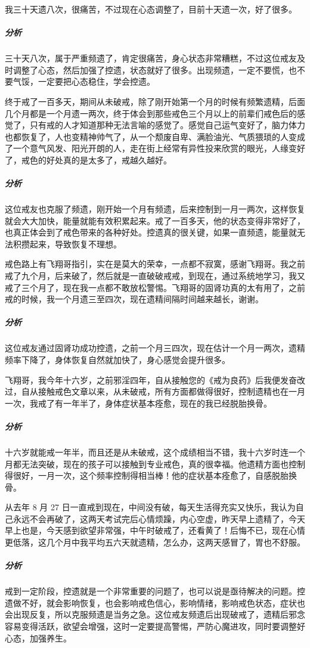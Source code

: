 \begin{case}
    我三十天遗八次，很痛苦，不过现在心态调整了，目前十天遗一次，好了很多。
    \subparagraph{分析} 三十天八次，属于严重频遗了，肯定很痛苦，身心状态非常糟糕，不过这位戒友及时调整了心态，然后加强了控遗，状态就好了很多。出现频遗，一定不要慌，也不要气馁，一定要把心态稳住，学会控遗。
\end{case}

\begin{case}
    终于戒了一百多天，期间从未破戒，除了刚开始第一个月的时候有频繁遗精，后面几个月都是一个月遗一两次，终于体会到那些戒色三个月以上的前辈们戒色后的感觉了，只有戒的人才知道那种无法言喻的感觉了。感觉自己运气变好了，脑力体力也都恢复了，人也变精神帅气了，从一个颓废自卑、满脸油光、气质猥琐的人变成了一个意气风发、阳光开朗的人，走在街上经常有异性投来欣赏的眼光，人缘变好了，戒色的好处真的是太多了，戒越久越好。
    \subparagraph{分析} 这位戒友也克服了频遗，刚开始一个月有频遗，后来控制到一月一两次，这样恢复就会大大加快，能量就能有效积累起来。戒了一百多天，他的状态变得非常好了，也真正体会到了戒色带来的各种好处。控遗真的很关键，如果一直频遗，能量就无法积攒起来，导致恢复不理想。
\end{case}

\begin{case}
    戒色路上有飞翔哥指引，实在是莫大的荣幸，一点都不寂寞，感谢飞翔哥。我之前戒了九个月，后来破了，然后就是一直破破戒戒，到现在，通过系统地学习，我又戒了三个月了，现在我一点都不敢放松警惕。飞翔哥的固肾功真的太有用了，之前戒的时候，我一个月遗三至四次，现在遗精间隔时间越来越长，谢谢。
    \subparagraph{分析} 这位戒友通过固肾功成功控遗，之前一个月三四次，现在估计一个月一两次，遗精频率下降了，身体恢复自然就加快了，身心感觉会提升很多。
\end{case}

\begin{case}
    飞翔哥，我今年十六岁，之前邪淫四年，自从接触您的《戒为良药》后我便发奋改过，自从接触戒色文章以来，从未破戒，所有方面都做得很好，控制遗精也在一月一次，我戒了有一年半了，身体症状基本痊愈，现在的我已经脱胎换骨。
    \subparagraph{分析} 十六岁就能戒一年半，而且还是从未破戒，这个成绩相当不错，我十六岁时连一个月都无法突破，现在的孩子可以接触到专业戒色，真的很幸福。他遗精方面也控制得很好，一月一次，这个频率控制得相当棒！他的症状基本痊愈了，自感脱胎换骨。
\end{case}

\begin{case}
    从去年 8 月 27 日一直戒到现在，中间没有破，每天生活得充实又快乐，我认为自己永远不会再破了，这两天考试完后心情烦躁，内心空虚，昨天早上遗精了，今天早上也是，今天感到欲望非常强，中午时破戒了，还看黄了！后悔不已，现在心情更低落，这几个月中我平均五六天就遗精，怎么办，这两天感冒了，胃也不舒服。
    \subparagraph{分析} 戒到一定阶段，控遗就是一个非常重要的问题了，也可以说是亟待解决的问题。控遗做不好，就会影响恢复，也会影响戒色信心，影响情绪，影响戒色状态，症状也会出现反复，所以克服频遗是当务之急。这位戒友频遗后出现破戒了，遗精后邪念容易变得活跃，欲望会增强，这时一定要提高警惕，严防心魔进攻，同时要调整好心态，加强养生。
\end{case}

